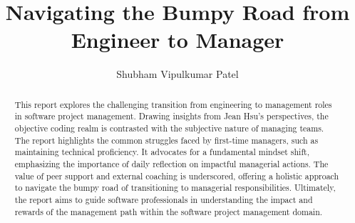 \documentclass[runningheads]{llncs}
\begin{document}
%
\title{Navigating the Bumpy Road from Engineer to Manager}
%
%
\author{Shubham Vipulkumar Patel
}
%
%

%
\maketitle              %
%
\begin{abstract}
This report explores the challenging transition from engineering to management roles in software project management. Drawing insights from Jean Hsu's perspectives, the objective coding realm is contrasted with the subjective nature of managing teams. The report highlights the common struggles faced by first-time managers, such as maintaining technical proficiency. It advocates for a fundamental mindset shift, emphasizing the importance of daily reflection on impactful managerial actions. The value of peer support and external coaching is underscored, offering a holistic approach to navigate the bumpy road of transitioning to managerial responsibilities. Ultimately, the report aims to guide software professionals in understanding the impact and rewards of the management path within the software project management domain.

\end{abstract}
%
%
%
\end{document}
